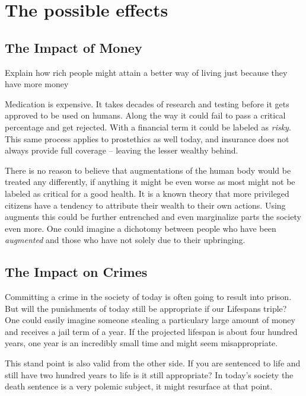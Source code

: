 \documentclass[
      12pt,
      a4paper,
      cleardoublepage=empty,
      final,
      twoside
        ]{scrbook}
\begin{document}
  \section{The possible effects}
    \subsection{The Impact of Money}
      \begin{par}

        Explain how rich people might attain a better way of living just because they have more money

      \end{par}
      \begin{par}
        Medication is expensive. It takes decades of research and testing before it gets approved to be used on humans. 
        Along the way it could fail to pass a critical percentage and get rejected.
        With a financial term it could be labeled as \emph{risky}.
        This same process applies to prostethics as well today, and insurance does not always provide full coverage -- leaving the lesser wealthy behind.
      \end{par}
      \begin{par}
        There is no reason to believe that augmentations of the human body would be treated any differently, if anything it might be even worse as most might not be labeled as critical for a good health.
        It is a known theory that more privileged citizens have a tendency to attribute their wealth to their own actions.\cite{MoneyMean} 
        Using augments this could be further entrenched and even marginalize parts the society even more.
        One could imagine a dichotomy between people who have been \emph{augmented} and those who have not solely due to their upbringing.
      \end{par}
  \subsection{The Impact on Crimes}
    \begin{par}
      Committing a crime in the society of today is often going to result into prison.
      But will the punishments of today still be appropriate if our Lifespans triple?
      One could easily imagine someone stealing a particulary large amount of money and receives a jail term of a year.
      If the projected lifespan is about four hundred years, one year is an incredibly small time and might seem misappropriate.
    \end{par}
    \begin{par}
      This stand point is also valid from the other side. If you are sentenced to life and still have two hundred years to life is it still appropriate?
      In today's society the death sentence is a very polemic subject, it might resurface at that point.
    \end{par}
\end{document}
